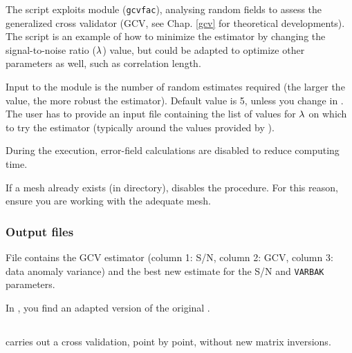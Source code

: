 The script  exploits \diva module (\texttt{gcvfac}), analysing random fields to assess the generalized cross validator (GCV, see Chap. \ref{gcv} for theoretical developments). The script  is an example of how to minimize the estimator by changing the signal-to-noise ratio ($\lambda$) value, but could be adapted to optimize other parameters as well, such as correlation length.

Input to the module is the number of random estimates required (the larger the value, the more robust the estimator). Default value is 5, unless you change in . The user has to provide an input file  containing the list of values for $\lambda$ on which to try the estimator (typically around the values provided by ).

During the  execution, error-field calculations are disabled to reduce computing time. 

\btips
If a mesh already exists (in  directory),  disables the  procedure. For this reason, ensure you are working with the adequate mesh.
\etips

\subsubsection{Output files}

File  contains the GCV estimator (column 1: S/N, column 2: GCV, column 3: data anomaly variance) and  the best new estimate for the S/N and \texttt{VARBAK} parameters.

In , you find an adapted version of the original .



\subsection{}

 carries out a cross validation, point by point, without new matrix inversions. 

\subsection{}


